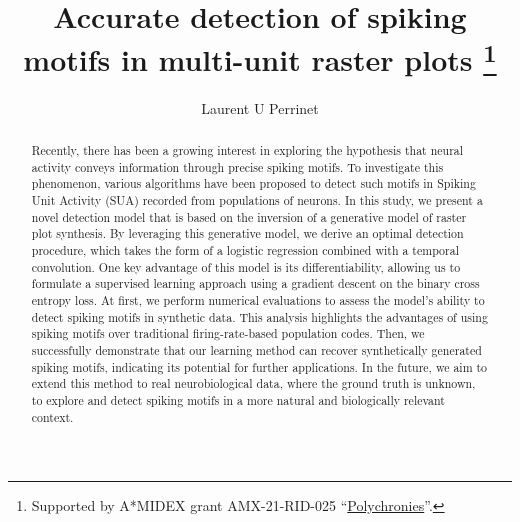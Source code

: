 \documentclass[runningheads]{llncs}
\begin{document}
\title{Accurate detection of spiking motifs in multi-unit raster plots
\thanks{Supported by A*MIDEX grant AMX-21-RID-025 ``\href{https://laurentperrinet.github.io/grant/polychronies/}{Polychronies}''.}
}

\author{
Laurent U Perrinet
}
%
%
%
\maketitle              %
%
\begin{abstract} 
Recently, there has been a growing interest in exploring the hypothesis that neural activity conveys information through precise spiking motifs. To investigate this phenomenon, various algorithms have been proposed to detect such motifs in Spiking Unit Activity (SUA) recorded from populations of neurons.
In this study, we present a novel detection model that is based on the inversion of a generative model of raster plot synthesis. By leveraging this generative model, we derive an optimal detection procedure, which takes the form of a logistic regression combined with a temporal convolution. One key advantage of this model is its differentiability, allowing us to formulate a supervised learning approach using a gradient descent on the binary cross entropy loss. 
At first, we perform numerical evaluations to assess the model's ability to detect spiking motifs in synthetic data. This analysis highlights the advantages of using spiking motifs over traditional firing-rate-based population codes. Then, we successfully demonstrate that our learning method can recover synthetically generated spiking motifs, indicating its potential for further applications. In the future, we aim to extend this method to real neurobiological data, where the ground truth is unknown, to explore and detect spiking motifs in a more natural and biologically relevant context.
%
\end{abstract}
\end{document}

